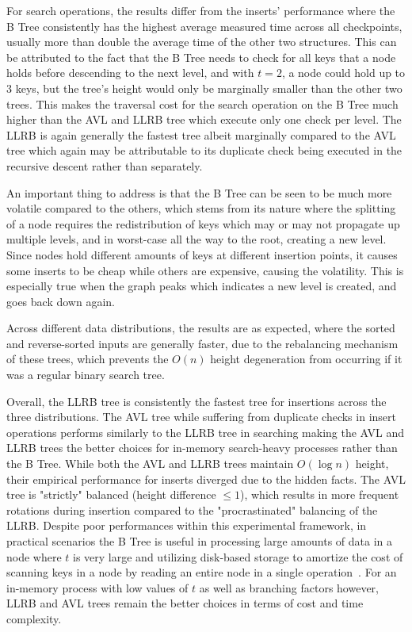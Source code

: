 \documentclass[12pt]{article}
\begin{document}
For search operations, the results differ from the inserts' performance where the B Tree consistently has the highest average measured time across all checkpoints, usually more than double the average time of the other two structures. This can be attributed to the fact that the B Tree needs to check for all keys that a node holds before descending to the next level, and with $t=2$, a node could hold up to 3 keys, but the tree's height would only be marginally smaller than the other two trees. This makes the traversal cost for the search operation on the B Tree much higher than the AVL and LLRB tree which execute only one check per level. The LLRB is again generally the fastest tree albeit marginally compared to the AVL tree which again may be attributable to its duplicate check being executed in the recursive descent rather than separately.

An important thing to address is that the B Tree can be seen to be much more volatile compared to the others, which stems from its nature where the splitting of a node requires the redistribution of keys which may or may not propagate up multiple levels, and in worst-case all the way to the root, creating a new level. Since nodes hold different amounts of keys at different insertion points, it causes some inserts to be cheap while others are expensive, causing the volatility. This is especially true when the graph peaks which indicates a new level is created, and goes back down again.

Across different data distributions, the results are as expected, where the sorted and reverse-sorted inputs are generally faster, due to the rebalancing mechanism of these trees, which prevents the $O (n)$ height degeneration from occurring if it was a regular binary search tree.

Overall, the LLRB tree is consistently the fastest tree for insertions across the three distributions. The AVL tree while suffering from duplicate checks in insert operations performs similarly to the LLRB tree in searching making the AVL and LLRB trees the better choices for in-memory search-heavy processes rather than the B Tree. While both the AVL and LLRB trees maintain $O(\log n)$ height, their empirical performance for inserts diverged due to the hidden facts. The AVL tree is "strictly" balanced (height difference $\leq 1$), which results in more frequent rotations during insertion compared to the "procrastinated" balancing of the LLRB. Despite poor performances within this experimental framework, in practical scenarios the B Tree is useful in processing large amounts of data in a node where $t$ is very large and utilizing disk-based storage to amortize the cost of scanning keys in a node by reading an entire node in a single operation~\cite{alma9931552389604761}. For an in-memory process with low values of $t$ as well as branching factors however, LLRB and AVL trees remain the better choices in terms of cost and time complexity.
\end{document}
